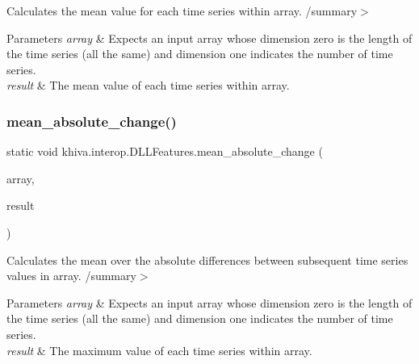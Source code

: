 Calculates the mean value for each time series within array. /summary$>$ 
\begin{DoxyParams}{Parameters}
{\em array} & Expects an input array whose dimension zero is the length of the time series (all the same) and dimension one indicates the number of time series.\\
\hline
{\em result} & The mean value of each time series within array.\\
\hline
\end{DoxyParams}


\mbox{\label{classkhiva_1_1interop_1_1_d_l_l_features_a88f943ce2a238bb143e32f2d4fe632d5}} 
\subsubsection{\texorpdfstring{mean\+\_\+absolute\+\_\+change()}{mean\_absolute\_change()}}
{\footnotesize\ttfamily static void khiva.\+interop.\+D\+L\+L\+Features.\+mean\+\_\+absolute\+\_\+change (\begin{DoxyParamCaption}\item[{\mbox{[}\+In\mbox{]} ref Int\+Ptr}]{array,  }\item[{\mbox{[}\+Out\mbox{]} out Int\+Ptr}]{result }\end{DoxyParamCaption})\hspace{0.3cm}{\ttfamily [static]}}



Calculates the mean over the absolute differences between subsequent time series values in array. /summary$>$ 
\begin{DoxyParams}{Parameters}
{\em array} & Expects an input array whose dimension zero is the length of the time series (all the same) and dimension one indicates the number of time series.\\
\hline
{\em result} & The maximum value of each time series within array.\\
\hline
\end{DoxyParams}


\mbox{\label{classkhiva_1_1interop_1_1_d_l_l_features_abc61c1c3c5f9aa52732f8631fdd7db6d}} 
